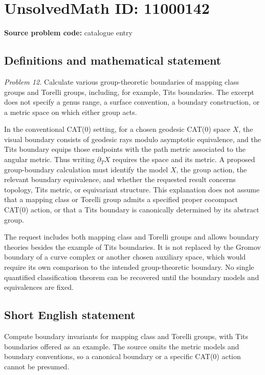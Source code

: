 \documentclass[11pt]{article}
\begin{document}
\section*{UnsolvedMath ID: 11000142}
\textbf{Source problem code:} catalogue entry
\subsection{Definitions and mathematical statement}
\emph{Problem 12.} Calculate various group-theoretic boundaries of mapping class groups and Torelli groups, including, for example, Tits boundaries. The excerpt does not specify a genus range, a surface convention, a boundary construction, or a metric space on which either group acts.

In the conventional CAT(0) setting, for a chosen geodesic CAT(0) space \(X\), the visual boundary consists of geodesic rays modulo asymptotic equivalence, and the Tits boundary equips those endpoints with the path metric associated to the angular metric. Thus writing \(\partial_T X\) requires the space and its metric. A proposed group-boundary calculation must identify the model \(X\), the group action, the relevant boundary equivalence, and whether the requested result concerns topology, Tits metric, or equivariant structure. This explanation does not assume that a mapping class or Torelli group admits a specified proper cocompact CAT(0) action, or that a Tits boundary is canonically determined by its abstract group.

The request includes both mapping class and Torelli groups and allows boundary theories besides the example of Tits boundaries. It is not replaced by the Gromov boundary of a curve complex or another chosen auxiliary space, which would require its own comparison to the intended group-theoretic boundary. No single quantified classification theorem can be recovered until the boundary models and equivalences are fixed.
\subsection{Short English statement}
Compute boundary invariants for mapping class and Torelli groups, with Tits boundaries offered as an example. The source omits the metric models and boundary conventions, so a canonical boundary or a specific CAT(0) action cannot be presumed.
\end{document}
